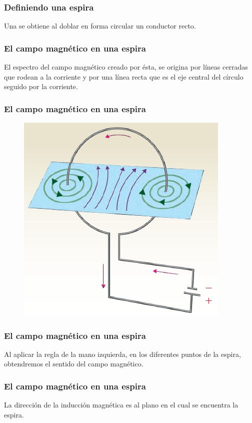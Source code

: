 \documentclass[14pt]{beamer}
\begin{document}
\begin{frame}
\frametitle{Definiendo una espira}
Una  se obtiene al doblar en forma circular un conductor recto.
\end{frame}
\begin{frame}
\frametitle{El campo magnético en una espira}
El espectro del campo magnético creado por ésta, se origina por líneas cerradas que rodean a la corriente
y por una línea recta que es el eje central del círculo seguido por la corriente.
\end{frame}
\begin{frame}
\frametitle{El campo magnético en una espira}
\begin{figure}
    \centering
    \includegraphics[scale=0.6]{Imagenes/Electromagnetismo_07.png}
\end{figure}
\end{frame}    
\begin{frame}
\frametitle{El campo magnético en una espira}    
Al aplicar la regla de la mano izquierda, en los diferentes puntos de la espira, obtendremos el sentido del campo magnético.
\end{frame}
\begin{frame}
\frametitle{El campo magnético en una espira}    
La dirección de la inducción magnética es  al plano en el cual se encuentra la espira.
\end{frame}
\end{document}
